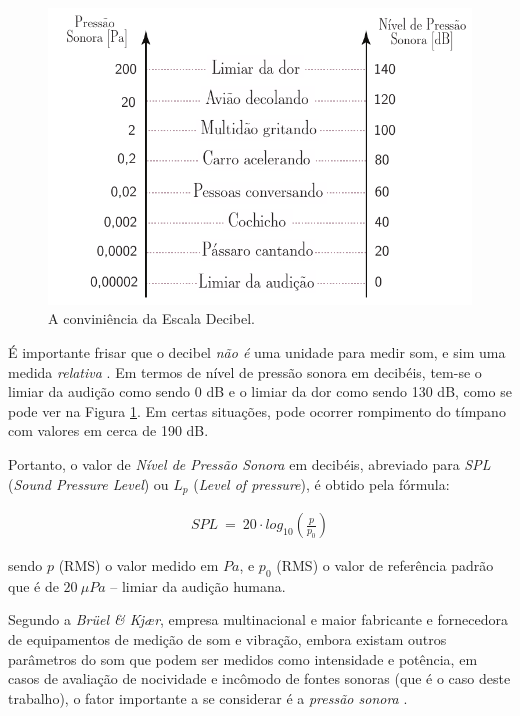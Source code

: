 \documentclass[
    12pt,               %
    openright,          %
    oneside,
    a4paper,            
    english,            %
    brazil              %
    ]{abntex2}
\begin{document}
\begin{figure}[!htb]
  \caption{\label{escala}A conviniência da Escala Decibel.}
  \begin{center}
    \includegraphics[scale=0.9]{images/escala.pdf}
  \end{center}
\end{figure}

É importante frisar que o decibel \textit{não é} uma unidade para medir som, e sim uma medida \textit{relativa} \cite{water}. Em termos de nível de pressão sonora em decibéis, tem-se o limiar da audição como sendo 0 dB e o limiar da dor como sendo 130 dB, como se pode ver na Figura \ref{escala}. Em certas situações, pode ocorrer rompimento do tímpano com valores em cerca de 190 dB.

Portanto, o valor de \textit{Nível de Pressão Sonora} em decibéis, abreviado para \textit{SPL} (\textit{Sound Pressure Level}) ou $L_p$ (\textit{Level of pressure}), é obtido pela fórmula:

\begin{align}\label{eq-dec}
  SPL \ = \ 20\cdot log_{10} \left(\frac{p}{p_0}\right)
\end{align}

sendo $p$ (RMS) o valor medido em $Pa$, e $p_0$ (RMS) o valor de referência padrão que é de $20 \ \mu Pa$ -- limiar da audição humana. 

Segundo a \textit{Brüel \& Kjær}, empresa multinacional e maior fabricante e fornecedora de equipamentos de medição de som e vibração, embora existam outros parâmetros do som que podem ser medidos como intensidade e potência, em casos de avaliação de nocividade e incômodo de fontes sonoras (que é o caso deste trabalho), o fator importante a se considerar é a \textit{pressão sonora} \cite{bojo}.
\end{document}
